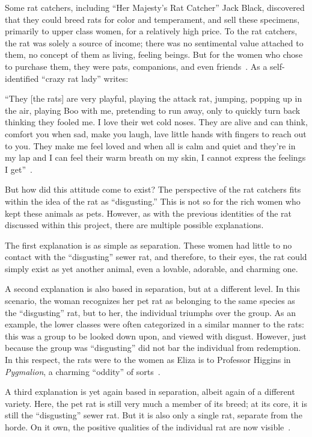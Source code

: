 \documentclass[12pt]{article}
\begin{document}
Some rat catchers, including ``Her Majesty's Rat Catcher'' Jack Black, discovered that they could breed rats for color and temperament, and sell these specimens, primarily to upper class women, for a relatively high price. To the rat catchers, the rat was solely a source of income; there was no sentimental value attached to them, no concept of them as living, feeling beings. But for the women who chose to purchase them, they were pats, companions, and even friends~\cite{Edelman2002, Edelman2005}. As a self-identified ``crazy rat lady'' writes:

``They [the rats] are very playful, playing the attack rat, jumping, popping up in the air, playing Boo with me, pretending to run away, only to quickly turn back thinking they fooled me. I love their wet cold noses. They are alive and can think, comfort you when sad, make you laugh, lave little hands with fingers to reach out to you. They make me feel loved and when all is calm and quiet and they're in my lap and I can feel their warm breath on my skin, I cannot express the feelings I get''~\cite{Edelman2005}.

But how did this attitude come to exist? The perspective of the rat catchers fits within the idea of the rat as ``disgusting.'' This is not so for the rich women who kept these animals as pets. However, as with the previous identities of the rat discussed within this project, there are multiple possible explanations.

The first explanation is as simple as separation. These women had little to no contact with the ``disgusting'' sewer rat, and therefore, to their eyes, the rat could simply exist as yet another animal, even a lovable, adorable, and charming one.

A second explanation is also based in separation, but at a different level. In this scenario, the woman recognizes her pet rat as belonging to the same species as the ``disgusting'' rat, but to her, the individual triumphs over the group. As an example, the lower classes were often categorized in a similar manner to the rats: this was a group to be looked down upon, and viewed with disgust. However, just because the group was ``disgusting'' did not bar the individual from redemption. In this respect, the rats were to the women as Eliza is to Professor Higgins in \textit{Pygmalion}, a charming ``oddity'' of sorts~\cite{Edelman2002, Edelman2005}.

A third explanation is yet again based in separation, albeit again of a different variety. Here, the pet rat is still very much a member of its breed; at its core, it is still the ``disgusting'' sewer rat. But it is also only a single rat, separate from the horde. On it own, the positive qualities of the individual rat are now visible~\cite{Edelman2005}.
\end{document}
